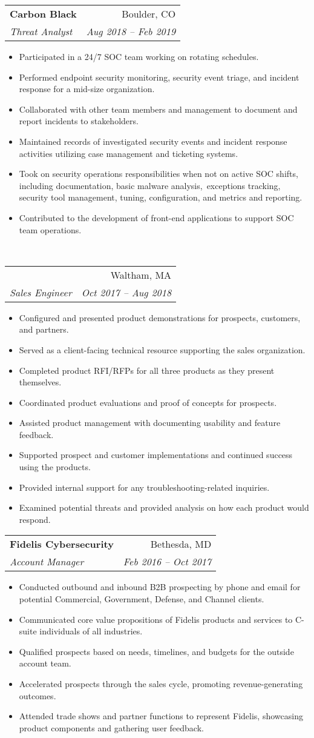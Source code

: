 \documentclass[letterpaper,11pt]{article}
\makeatletter
\newcommand{\resumeSubheading}[4]{
  \vspace{-1pt}\item
    \begin{tabular*}{0.97\textwidth}[t]{l@{\extracolsep{\fill}}r}
      \textbf{#1} & #2 \\
      \textit{\small#3} & \textit{\small #4} \\
    \end{tabular*}\vspace{-5pt}
}
\newcommand{\resumeSubSubheading}[4]{
  \vspace{2pt}
    \begin{tabular*}{0.97\textwidth}[t]{l@{\extracolsep{\fill}}r}
      #1 & #2 \\
      \textit{\small#3} & \textit{\small#4} \\
    \end{tabular*}\vspace{-5pt}
}
\newcommand{\resumeItemListStart}{\begin{itemize}[nosep]}
\newcommand{\resumeItemListEnd}{\end{itemize}\vspace{-5pt}}
\makeatother
\begin{document}
\resumeSubheading
{Carbon Black}{Boulder, CO}
{Threat Analyst}{Aug 2018 -- Feb 2019}
\resumeItemListStart
\item Participated in a 24/7 SOC team working on rotating schedules.
\item Performed endpoint security monitoring, security event triage, and incident response for a mid-size organization.
\item Collaborated with other team members and management to document and report incidents to stakeholders.
\item Maintained records of investigated security events and incident response activities utilizing case management and ticketing systems.
\item Took on security operations responsibilities when not on active SOC shifts, including documentation, basic malware analysis,\
exceptions tracking, security tool management, tuning, configuration, and metrics and reporting.
\item Contributed to the development of front-end applications to support SOC team operations.
\resumeItemListEnd

\
\resumeSubSubheading
{}{Waltham, MA}
{Sales Engineer}{Oct 2017 -- Aug 2018}
\resumeItemListStart
\item Configured and presented product demonstrations for prospects, customers, and partners.
\item Served as a client-facing technical resource supporting the sales organization.
\item Completed product RFI/RFPs for all three products as they present themselves.
\item Coordinated product evaluations and proof of concepts for prospects.
\item Assisted product management with documenting usability and feature feedback.
\item Supported prospect and customer implementations and continued success using the products.
\item Provided internal support for any troubleshooting-related inquiries.
\item Examined potential threats and provided analysis on how each product would respond.
\resumeItemListEnd

\resumeSubheading
{Fidelis Cybersecurity}{Bethesda, MD}
{Account Manager}{Feb 2016 -- Oct 2017}
\resumeItemListStart
\item Conducted outbound and inbound B2B prospecting by phone and email for potential Commercial, Government, Defense, and Channel clients.
\item Communicated core value propositions of Fidelis products and services to C-suite individuals of all industries.
\item Qualified prospects based on needs, timelines, and budgets for the outside account team.
\item Accelerated prospects through the sales cycle, promoting revenue-generating outcomes.
\item Attended trade shows and partner functions to represent Fidelis, showcasing product components and gathering user feedback.
\resumeItemListEnd
\end{document}
